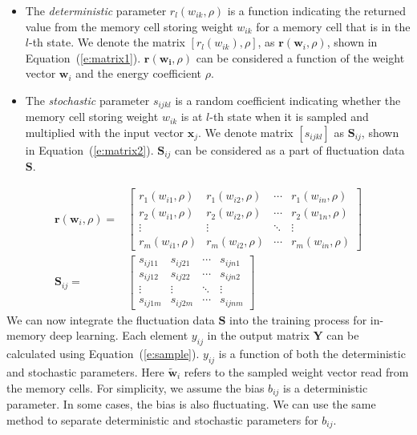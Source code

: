 \documentclass[10pt,journal,compsoc]{IEEEtran}
\begin{document}
\begin{itemize}
\item The {{\textit{deterministic}}} parameter $r_l(w_{ik},\rho)$ is a function indicating the returned value from the memory cell storing weight $w_{ik}$ for a memory cell that is in the $l$-th state. We denote the matrix $[r_l(w_{ik}),\rho]$, as $\mathbf{r}(\mathbf{w}_i,\rho)$, shown in Equation~(\ref{e:matrix1}). $\mathbf{r}(\mathbf{w_i},\rho)$ can be considered a function of the weight vector $\mathbf{{w}}_i$ and the energy coefficient $\rho$.

\item The {{\textit{stochastic}}} parameter $s_{ijkl}$ is a random coefficient indicating whether the memory cell storing weight $w_{ik}$ is at $l$-th state when it is sampled and multiplied with the input vector $\mathbf{x}_j$. We denote matrix $[s_{ijkl}]$ as $\mathbf{S}_{ij}$, shown in Equation~(\ref{e:matrix2}). $\mathbf{S}_{ij}$ can be considered as a part of fluctuation data $\mathbf{S}$. 
\end{itemize}
\begin{align}
\mathbf{r}(\mathbf{w}_i,\rho) =& 
\begin{bmatrix}
r_1(w_{i1},\rho) &r_1(w_{i2},\rho) &\cdots &r_{1}(w_{in},\rho) \\
r_2(w_{i1},\rho) &r_2(w_{i2},\rho) &\cdots &r_{2}(w_{1n},\rho) \\
\vdots  &\vdots  &\ddots &\vdots  \\
r_m(w_{i1},\rho) &r_m(w_{i2},\rho) &\cdots &r_{m}(w_{in},\rho)
\end{bmatrix}\label{e:matrix1}\\
\mathbf{S}_{ij} = &
\begin{bmatrix}
s_{ij11} &s_{ij21} &\cdots &s_{ijn1} \\
s_{ij12} &s_{ij22} &\cdots &s_{ijn2} \\
\vdots  &\vdots  &\ddots &\vdots  \\
s_{ij1m} &s_{ij2m} &\cdots &s_{ijnm}
\end{bmatrix}
\label{e:matrix2}
\end{align}
We can now integrate the fluctuation data $\mathbf{S}$ into the training process for in-memory deep learning. Each element $y_{ij}$ in the output matrix $\mathbf{Y}$ can be calculated using Equation~(\ref{e:sample}). $y_{ij}$ is a function of both the deterministic and stochastic parameters. Here $\mathbf{\widetilde{w}}_i$ refers to the sampled weight vector read from the memory cells. For simplicity, we assume the bias $b_{ij}$ is a deterministic parameter. In some cases, the bias is also fluctuating. We can use the same method to separate deterministic and stochastic parameters for $b_{ij}$.
\end{document}
